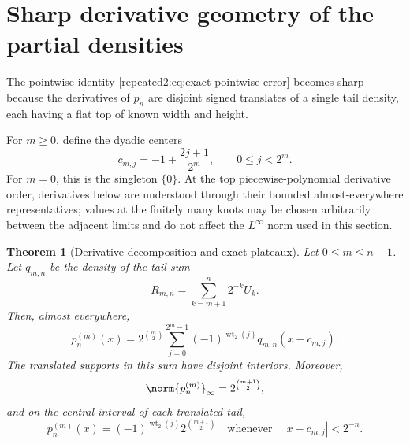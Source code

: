 \documentclass[11pt,oneside]{article}
\newtheorem{theorem}{Theorem}[section]
\theoremstyle{definition}
\theoremstyle{remark}
\newcommand{\wt}{\operatorname{wt}_2}
\begin{document}
\section{Sharp derivative geometry of the partial densities}
\label{repeated2:sec:partial-density-geometry}

The pointwise identity \eqref{repeated2:eq:exact-pointwise-error} becomes sharp because the derivatives
of $p_n$ are disjoint signed translates of a single tail density, each having a flat top of
known width and height.

For $m\ge0$, define the dyadic centers
\begin{equation}
 c_{m,j}=-1+\frac{2j+1}{2^m},
 \qquad 0\le j<2^m.
 \label{repeated2:eq:cmj-definition}
\end{equation}
For $m=0$, this is the singleton $\{0\}$.  At the top piecewise-polynomial derivative
order, derivatives below are understood through their bounded almost-everywhere
representatives; values at the finitely many knots may be chosen arbitrarily between the
adjacent limits and do not affect the $L^\infty$ norm used in this section.

\begin{theorem}[Derivative decomposition and exact plateaux]
\label{repeated2:thm:partial-derivative-geometry}
Let $0\le m\le n-1$.  Let $q_{m,n}$ be the density of the tail sum
\begin{equation}
 R_{m,n}=\sum_{k=m+1}^{n}2^{-k}U_k.
 \label{repeated2:eq:Rmn}
\end{equation}
Then, almost everywhere,
\begin{equation}
 p_n^{(m)}(x)=2^{\binom m2}
 \sum_{j=0}^{2^m-1}(-1)^{\wt(j)}q_{m,n}(x-c_{m,j}).
 \label{repeated2:eq:pnm-decomposition}
\end{equation}
The translated supports in this sum have disjoint interiors.  Moreover,
\begin{equation}
 \norm{p_n^{(m)}}_\infty=2^{\binom{m+1}{2}},
 \label{repeated2:eq:pnm-norm}
\end{equation}
and on the central interval of each translated tail,
\begin{equation}
 p_n^{(m)}(x)=(-1)^{\wt(j)}2^{\binom{m+1}{2}}
 \quad\text{whenever}\quad |x-c_{m,j}|<2^{-n}.
 \label{repeated2:eq:pnm-plateau}
\end{equation}
\end{theorem}
\end{document}
